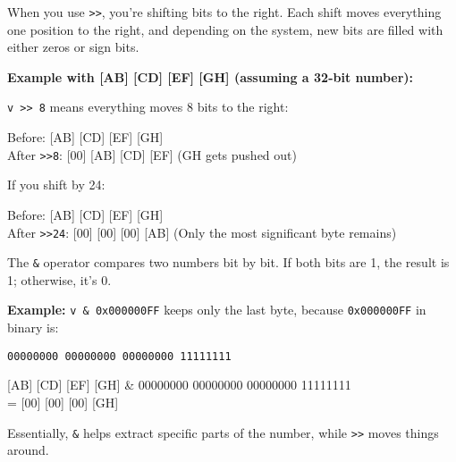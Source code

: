\begin{NexMainBox}
	\begin{NexMainBox}[dark, crnA, title=\textbf{What happens when you use >> (bit shifting)?}]
		When you use \texttt{>>}, you’re shifting bits to the right. Each shift moves everything one position to the right, and depending on the system, new bits are filled with either zeros or sign bits.

		\textbf{Example with [AB] [CD] [EF] [GH] (assuming a 32-bit number):}

		\texttt{v >> 8} means everything moves 8 bits to the right:

		\begin{NexMainBox}[light]
		\begin{center}
		Before:  [AB] [CD] [EF] [GH]\\
		After \texttt{>>8}:  [00] [AB] [CD] [EF]  (GH gets pushed out)
		\end{center}
	\end{NexMainBox}
		If you shift by 24:
		\begin{NexMainBox}[light]
		\begin{center}
		Before:  [AB] [CD] [EF] [GH]\\
		After \texttt{>>24}:  [00] [00] [00] [AB]  (Only the most significant byte remains)
		\end{center}

	\end{NexMainBox}
	\end{NexMainBox}

	\begin{NexMainBox}[dark, crnA, title=\textbf{What happens when you use \& (bit masking)?}]
		The \texttt{\&} operator compares two numbers bit by bit. If both bits are 1, the result is 1; otherwise, it’s 0.

		\textbf{Example:} \texttt{v \& 0x000000FF} keeps only the last byte, because \texttt{0x000000FF} in binary is:

		\texttt{00000000 00000000 00000000 11111111}

		\begin{NexMainBox}[light]
		\begin{center}
		[AB] [CD] [EF] [GH] \& 00000000 00000000 00000000 11111111\\
		= [00] [00] [00] [GH]
		\end{center}
	\end{NexMainBox}

		Essentially, \texttt{\&} helps extract specific parts of the number, while \texttt{>>} moves things around.
	\end{NexMainBox}


\end{NexMainBox}
